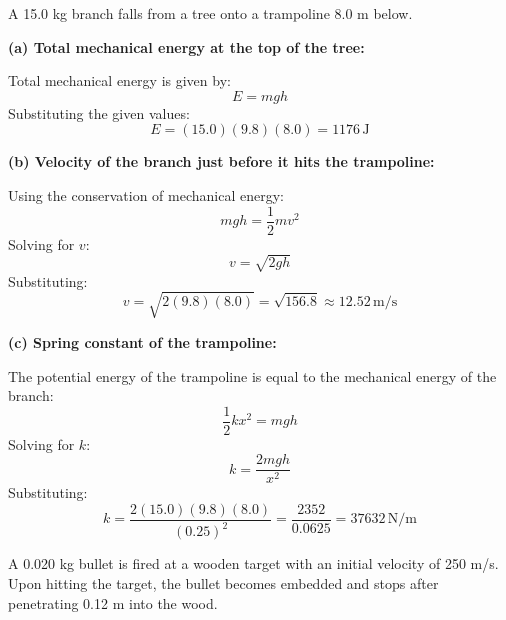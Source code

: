 \documentclass[addpoints]{exam}
\begin{document}
\begin{questions}
\question A 15.0 kg branch falls from a tree onto a trampoline 8.0 m below.
\begin{solution}[6cm]
\textbf{(a) Total mechanical energy at the top of the tree:}

    Total mechanical energy is given by:
    \[
    E = m g h
    \]
    Substituting the given values:
    \[
    E = (15.0)(9.8)(8.0) = 1176 \, \text{J}
    \]

    \textbf{(b) Velocity of the branch just before it hits the trampoline:}

    Using the conservation of mechanical energy:
    \[
    m g h = \frac{1}{2} m v^2
    \]
    Solving for \(v\):
    \[
    v = \sqrt{2 g h}
    \]
    Substituting:
    \[
    v = \sqrt{2 (9.8)(8.0)} = \sqrt{156.8} \approx 12.52 \, \text{m/s}
    \]

    \textbf{(c) Spring constant of the trampoline:}

    The potential energy of the trampoline is equal to the mechanical energy of the branch:
    \[
    \frac{1}{2} k x^2 = m g h
    \]
    Solving for \(k\):
    \[
    k = \frac{2 m g h}{x^2}
    \]
    Substituting:
    \[
    k = \frac{2 (15.0)(9.8)(8.0)}{(0.25)^2} = \frac{2352}{0.0625} = 37632 \, \text{N/m}
    \]
\end{solution}



\question A 0.020 kg bullet is fired at a wooden target with an initial velocity of 250 m/s. Upon hitting the target, the bullet becomes embedded and stops after penetrating 0.12 m into the wood.
\begin{parts}

\end{parts}
\end{questions}
\end{document}
